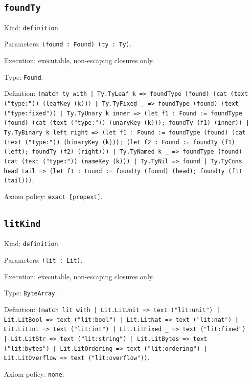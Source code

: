 \documentclass[11pt]{article}
\begin{document}
\subsection*{\texttt{foundTy}}
\noindent Kind: \texttt{definition}.\par
\noindent Parameters: \texttt{(found : Found) (ty : Ty)}.\par
\noindent Execution: executable, non-escaping closures only.\par
\noindent Type: \texttt{Found}.\par
\noindent Definition: \texttt{(match ty with | Ty.TyLeaf k => foundType (found) (cat (text ("type:")) (leafKey (k))) | Ty.TyFixed \_ => foundType (found) (text ("type:fixed")) | Ty.TyUnary k inner => (let f1 : Found := foundType (found) (cat (text ("type:")) (unaryKey (k))); foundTy (f1) (inner)) | Ty.TyBinary k left right => (let f1 : Found := foundType (found) (cat (text ("type:")) (binaryKey (k))); (let f2 : Found := foundTy (f1) (left); foundTy (f2) (right))) | Ty.TyNamed k \_ => foundType (found) (cat (text ("type:")) (nameKey (k))) | Ty.TyNil => found | Ty.TyCons head tail => (let f1 : Found := foundTy (found) (head); foundTy (f1) (tail)))}.\par
\noindent Axiom policy: \texttt{exact [propext]}.\par
\subsection*{\texttt{litKind}}
\noindent Kind: \texttt{definition}.\par
\noindent Parameters: \texttt{(lit : Lit)}.\par
\noindent Execution: executable, non-escaping closures only.\par
\noindent Type: \texttt{ByteArray}.\par
\noindent Definition: \texttt{(match lit with | Lit.LitUnit => text ("lit:unit") | Lit.LitBool => text ("lit:bool") | Lit.LitNat => text ("lit:nat") | Lit.LitInt => text ("lit:int") | Lit.LitFixed \_ => text ("lit:fixed") | Lit.LitStr => text ("lit:string") | Lit.LitBytes => text ("lit:bytes") | Lit.LitOrdering => text ("lit:ordering") | Lit.LitOverflow => text ("lit:overflow"))}.\par
\noindent Axiom policy: \texttt{none}.\par
\end{document}

